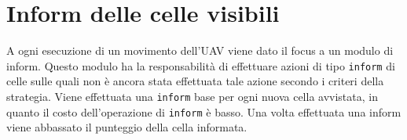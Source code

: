 \section{Inform delle celle visibili} \label{sec:inform}
A ogni esecuzione di un movimento dell'UAV viene dato il focus a un modulo di inform. Questo modulo ha la responsabilità di effettuare azioni di tipo \texttt{inform} di celle sulle quali non è ancora stata effettuata tale azione secondo i criteri della strategia. Viene effettuata una \texttt{inform} base per ogni nuova cella avvistata, in quanto il costo dell'operazione di \texttt{inform} è basso. Una volta effettuata una inform viene abbassato il punteggio della cella informata.
